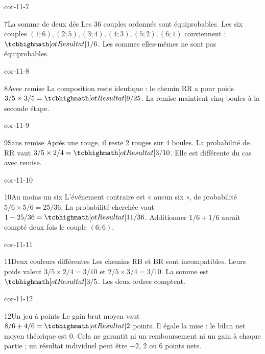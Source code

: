 \begin{blocLivre}{cor-11-7}\begin{corrige}{7}{La somme de deux dés}
Les 36 couples ordonnés sont équiprobables. Les six couples $(1;6),(2;5),(3;4),(4;3),(5;2),(6;1)$ conviennent : $\res{1/6}$. Les sommes elles-mêmes ne sont pas équiprobables.
\label{fig-cor-11-7}
\end{corrige}\end{blocLivre}
\begin{blocLivre}{cor-11-8}\begin{corrige}{8}{Avec remise}
La composition reste identique : le chemin RR a pour poids $3/5\times3/5=\res{9/25}$. La remise maintient cinq boules à la seconde étape.
\label{fig-cor-11-8}
\end{corrige}\end{blocLivre}
\begin{blocLivre}{cor-11-9}\begin{corrige}{9}{Sans remise}
Après une rouge, il reste 2 rouges sur 4 boules. La probabilité de RR vaut $3/5\times2/4=\res{3/10}$. Elle est différente du cas avec remise.
\label{fig-cor-11-9}
\end{corrige}\end{blocLivre}
\begin{blocLivre}{cor-11-10}\begin{corrige}{10}{Au moins un six}
L’événement contraire est « aucun six », de probabilité $5/6\times5/6=25/36$. La probabilité cherchée vaut $1-25/36=\res{11/36}$. Additionner $1/6+1/6$ aurait compté deux fois le couple $(6;6)$.
\end{corrige}\end{blocLivre}
\begin{blocLivre}{cor-11-11}\begin{corrige}{11}{Deux couleurs différentes}
Les chemins RB et BR sont incompatibles. Leurs poids valent $3/5\times2/4=3/10$ et $2/5\times3/4=3/10$. La somme est $\res{3/5}$. Les deux ordres comptent.
\label{fig-cor-11-11}
\end{corrige}\end{blocLivre}
\begin{blocLivre}{cor-11-12}\begin{corrige}{12}{Un jeu à points}
Le gain brut moyen vaut $8/6+4/6=\res2$ points. Il égale la mise : le bilan net moyen théorique est 0. Cela ne garantit ni un remboursement ni un gain à chaque partie ; un résultat individuel peut être $-2$, 2 ou 6 points nets.
\end{corrige}\end{blocLivre}
